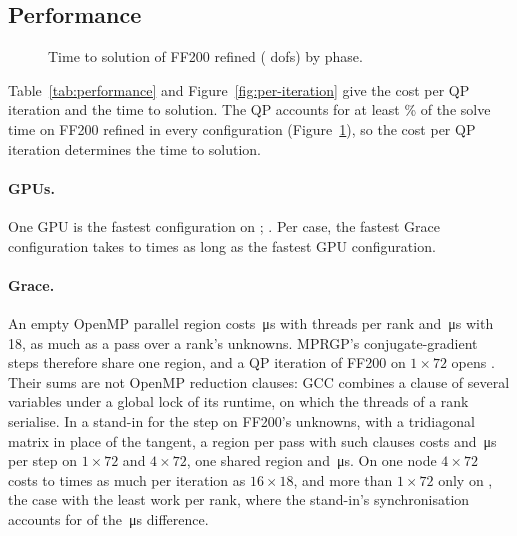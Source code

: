 \documentclass[sigconf,nonacm]{acmart}
\begin{document}
\begin{table}
\caption{SFEM ($S$, single process) against utopia ($U$) on the valve nodes: displacement
difference relative to utopia's displacement, largest signed distance of a contact node (positive
inside the obstacle), KKT measure of the final state, and Jaccard index of the contact sets.}
\label{tab:accuracy}
\small

\end{table}

\subsection{Performance}

\begin{figure}[t]
\centering

\caption{Time to solution of FF200 refined (\dofsFFf{} dofs) by phase.}
\label{fig:breakdown}
\end{figure}

Table~\ref{tab:performance} and Figure~\ref{fig:per-iteration} give the cost per QP iteration and
the time to solution. The QP accounts for at least \qpShareFFf\% of the solve time on FF200 refined
in every configuration (Figure~\ref{fig:breakdown}), so the cost per QP iteration determines the
time to solution.

\paragraph{GPUs.} One GPU is the fastest configuration on \oneGpuBestCases{}; \bestElsewhere{}. Per case, the fastest Grace configuration takes
\gpuOverGraceMin{} to \gpuOverGraceMax{} times as long as the fastest GPU configuration.

\paragraph{Grace.} An empty OpenMP parallel region costs \regionCostWide\,\si{\micro\second} with
\machineCores{} threads per rank and \regionCostNarrow\,\si{\micro\second} with 18, as much as a pass
over a rank's unknowns. MPRGP's conjugate-gradient steps therefore share one region, and a QP
iteration of FF200 on $1\times72$ opens \regionsPerIteration{}. Their sums are not OpenMP reduction
clauses: GCC combines a clause of several variables under a global lock of its runtime, on which
the threads of a rank serialise. In a stand-in for the step on FF200's unknowns, with a
tridiagonal matrix in place of the tangent, a region per pass with such clauses costs
\standinRegionsOne{} and \standinRegionsFour\,\si{\micro\second} per step on $1\times72$ and
$4\times72$, one shared region \standinTeamOne{} and \standinTeamFour\,\si{\micro\second}. On one
node $4\times72$ costs \hostThreadsMin{} to \hostThreadsMax{} times as much per iteration as
$16\times18$, and more than $1\times72$ only on \fourSlowerThanOneCases{}, the case with the least
work per rank, where the stand-in's synchronisation accounts for \standinGap{} of the
\hostGapOneFour\,\si{\micro\second} difference.
\end{document}
